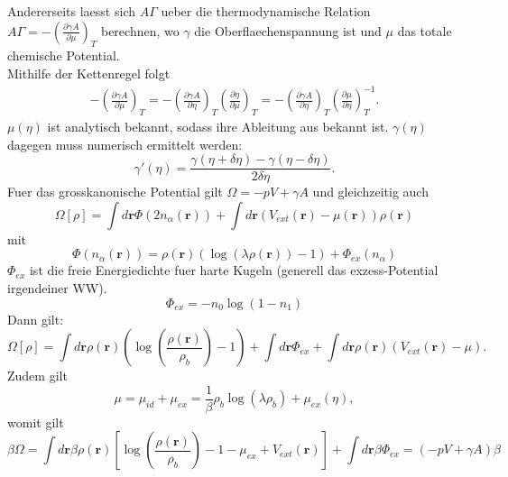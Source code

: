 \documentclass{article}
\begin{document}
Andererseits laesst sich $A\Gamma$ ueber die thermodynamische Relation $A\Gamma = - \left( \frac{\partial \gamma A}{\partial \mu} \right)_T$ berechnen, wo $\gamma$ die Oberflaechenspannung ist und $\mu$ das totale chemische Potential.\\
Mithilfe der Kettenregel folgt 
\begin{align}
	- \left( \frac{\partial \gamma A}{\partial \mu} \right)_T = - \left( \frac{\partial \gamma A}{\partial \eta} \right)_T \left( \frac{\partial \eta}{\partial \mu} \right)_T = - \left( \frac{\partial \gamma A}{\partial \eta} \right)_T  \left( \frac{\partial \mu}{\partial \eta} \right)_T^{-1}.
\end{align}
$\mu(\eta)$ ist analytisch bekannt, sodass ihre Ableitung aus bekannt ist.
$\gamma(\eta)$ dagegen muss numerisch ermittelt werden:
\begin{equation}
	\gamma'(\eta) = \frac{\gamma(\eta + \delta \eta)-\gamma(\eta-\delta \eta)}{2 \delta \eta}.
\end{equation}
Fuer das grosskanonische Potential gilt $\Omega = -pV + \gamma A$ und gleichzeitig auch 
\begin{equation}
	\Omega[\rho] = \int d\textbf{r} \Phi(2 n_\alpha(\textbf{r})) + \int d\textbf{r} (V_{ext}(\textbf{r}) - \mu(\textbf{r}))\rho(\textbf{r})
\end{equation}
mit
\begin{equation}
	\Phi(n_\alpha(\textbf{r})) = \rho(\textbf{r}) (\log(\lambda \rho(\textbf{r}))-1) + \Phi_{ex}(n_\alpha)
\end{equation}
$\Phi_{ex}$ ist die freie Energiedichte fuer harte Kugeln (generell das exzess-Potential irgendeiner WW).
\begin{equation}
	\Phi_{ex} = -n_0 \log(1-n_1)
\end{equation}
Dann gilt:
\begin{equation}
	\Omega[\rho] = \int d\textbf{r} \rho(\textbf{r}) \left(\log\left(\frac{\rho(\textbf{r})}{\rho_b}\right)-1\right) + \int d\textbf{r} \Phi_{ex} + \int d\textbf{r} \rho(\textbf{r}) (V_{ext}(\textbf{r})-\mu).
\end{equation}
Zudem gilt
\begin{equation}
	\mu = \mu_{id} + \mu_{ex} = \frac{1}{\beta} \rho_b \log(\lambda \rho_b) + \mu_{ex}(\eta),
\end{equation}
womit gilt
\begin{equation}
	\beta \Omega = \int d\textbf{r} \beta \rho(\textbf{r}) \left[ \log\left(\frac{\rho(\textbf{r})}{\rho_b}\right)-1-\mu_{ex} + V_{ext}(\textbf{r}) \right] + \int d\textbf{r} \beta \Phi_{ex} = (-pV+\gamma A)\beta
\end{equation}
\end{document}
